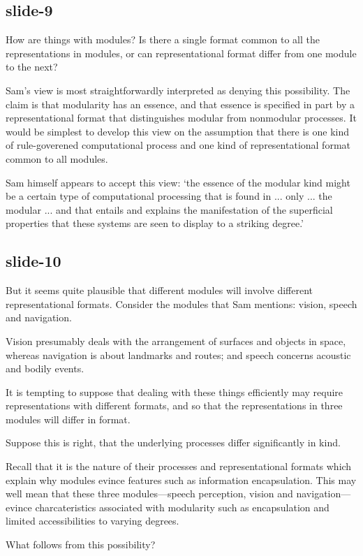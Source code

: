 \documentclass[12pt,\papersize]{extarticle}
\begin{document}
\subsection{slide-9}
How are things with modules?  Is there a single format common to all the representations
in modules, or can representational format differ from one module to the next?

Sam’s view is most straightforwardly interpreted as denying this possibility.
The claim is that modularity has an essence, and that essence is specified in part by
a representational format that distinguishes modular from nonmodular processes.
It would be simplest to develop this view on the assumption that there is
one kind of rule-goverened computational process and one kind of
representational format common to all modules.

Sam himself appears to accept this view:
‘the essence of the modular kind might be a certain type of computational processing that is found
in ... only ... the modular  ... and that entails and explains the
manifestation of the superficial properties that these systems are seen to display to a striking
degree.’

\subsection{slide-10}
But it seems quite plausible that different modules will involve
different representational formats.  Consider the modules that Sam mentions:
vision, speech and navigation.

Vision presumably deals with the arrangement of surfaces and objects in space,
whereas navigation is about landmarks and routes;
and speech concerns acoustic and bodily events.

It is tempting to suppose that dealing with these things efficiently may require
representations with different formats, and so that the
representations in three modules will differ in format.

Suppose this is right, that the underlying processes differ
significantly in kind.

Recall that it is the nature of their processes and representational formats which explain
why modules evince features such as information encapsulation.
This may well mean that these three modules---speech perception,
vision and navigation---evince charcateristics associated with modularity such as encapsulation
and limited accessibilities to varying degrees.

What follows from this possibility?
\end{document}
